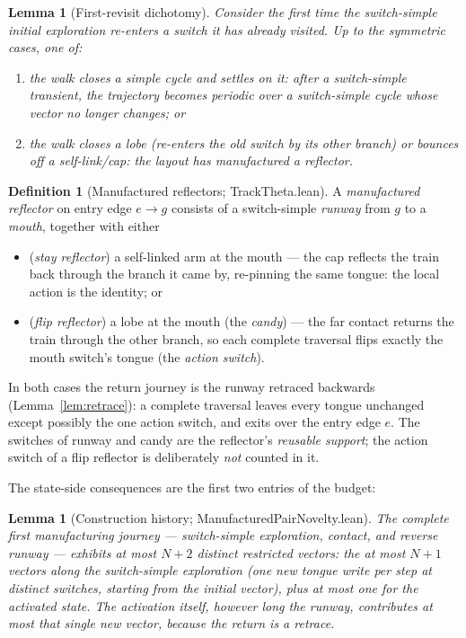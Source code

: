 \documentclass[11pt]{article}
\newtheorem{lemma}[theorem]{Lemma}
\theoremstyle{definition}
\newtheorem{definition}[theorem]{Definition}
\newcommand{\file}[1]{\textsf{#1}}
\begin{document}
\begin{lemma}[First-revisit dichotomy]\label{lem:dichotomy}
  Consider the first time the switch-simple initial exploration re-enters
  a switch it has already visited.  Up to the symmetric cases, one of:
  \begin{enumerate}
  \item the walk closes a \emph{simple cycle} and settles on it: after a
    switch-simple transient, the trajectory becomes periodic over a
    switch-simple cycle whose vector no longer changes; or
  \item the walk closes a \emph{lobe} (re-enters the old switch by its
    other branch) or bounces off a \emph{self-link/cap}: the layout has
    \emph{manufactured a reflector}.
  \end{enumerate}
\end{lemma}

\begin{definition}[Manufactured reflectors; \file{TrackTheta.lean}]
  \label{def:reflector}
  A \emph{manufactured reflector} on entry edge $e \to g$ consists of a
  switch-simple \emph{runway} from $g$ to a \emph{mouth}, together with
  either
  \begin{itemize}
  \item (\emph{stay reflector}) a self-linked arm at the mouth --- the cap
    reflects the train back through the branch it came by, re-pinning the
    same tongue: the local action is the identity; or
  \item (\emph{flip reflector}) a lobe at the mouth (the \emph{candy}) ---
    the far contact returns the train through the other branch, so each
    complete traversal flips exactly the mouth switch's tongue (the
    \emph{action switch}).
  \end{itemize}
  In both cases the return journey is the runway retraced backwards
  (Lemma~\ref{lem:retrace}): a complete traversal leaves every tongue
  unchanged except possibly the one action switch, and exits over the
  entry edge $e$.  The switches of runway and candy are the reflector's
  \emph{reusable support}; the action switch of a flip reflector is
  deliberately \emph{not} counted in it.
\end{definition}

The state-side consequences are the first two entries of the budget:

\begin{lemma}[Construction history; \file{ManufacturedPairNovelty.lean}]\label{lem:history}
  The complete first manufacturing journey --- switch-simple exploration,
  contact, and reverse runway --- exhibits at most $N+2$ distinct
  restricted vectors: the at most $N+1$ vectors along the switch-simple
  exploration (one new tongue write per step at distinct switches,
  starting from the initial vector), plus at most one for the activated
  state.  The activation itself, however long the runway, contributes at
  most that single new vector, because the return is a retrace.
\end{lemma}
\end{document}
